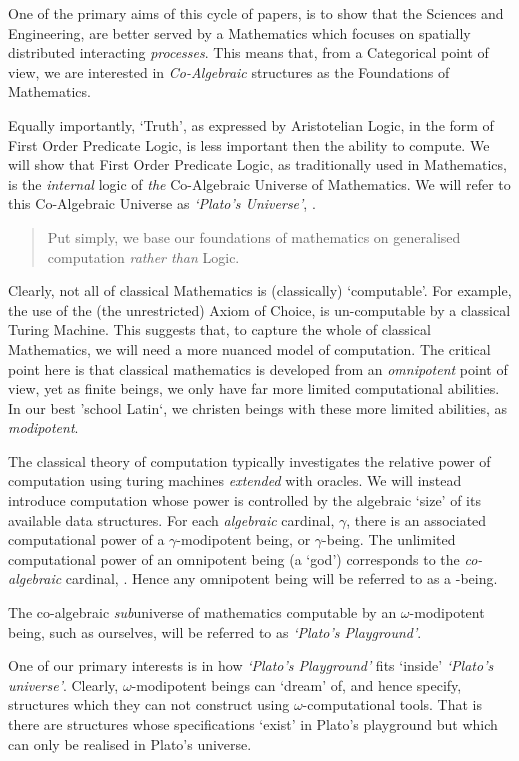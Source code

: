 \documentclass[a4paper,openany]{amsbook}
\newenvironment{myQuote}{\begin{quotation}}{\end{quotation}}
\begin{document}
One of the primary aims of this cycle of papers, is to show that the Sciences
and Engineering, are better served by a Mathematics which focuses on spatially
distributed interacting \emph{processes}. This means that, from a Categorical
point of view, we are interested in \emph{Co-Algebraic} structures as the
Foundations of Mathematics.

Equally importantly, `Truth', as expressed by Aristotelian Logic, in the form of
First Order Predicate Logic, is less important then the ability to compute. We
will show that First Order Predicate Logic, as traditionally used in
Mathematics, is the \emph{internal} logic of \emph{the} Co-Algebraic Universe of
Mathematics. We will refer to this Co-Algebraic Universe as \emph{`Plato's
Universe'}, \Universe{}{}.

\begin{myQuote}
Put simply, we base our foundations of mathematics on generalised
computation \emph{rather than} Logic.
\end{myQuote}

Clearly, not all of classical Mathematics is (classically) `computable'. For
example, the use of the (the unrestricted) Axiom of Choice, is un-computable by
a classical Turing Machine. This suggests that, to capture the whole of
classical Mathematics, we will need a more nuanced model of computation. The
critical point here is that classical mathematics is developed from an
\emph{omnipotent} point of view, yet as finite beings, we only have far more
limited computational abilities. In our best 'school Latin`, we christen beings
with these more limited abilities, as \emph{modipotent}.

The classical theory of computation typically investigates the relative power of
computation using turing machines \emph{extended} with oracles. We will instead
introduce computation whose power is controlled by the algebraic `size' of its
available data structures. For each \emph{algebraic} cardinal, $\gamma$, there
is an associated computational power of a $\gamma$-modipotent being, or
$\gamma$-being. The unlimited computational power of an omnipotent being (a
`god') corresponds to the \emph{co-algebraic} cardinal, \Cardinal. Hence any
omnipotent being will be referred to as a \Cardinal-being.

The co-algebraic \emph{sub}universe of mathematics computable by an
$\omega$-modipotent being, such as ourselves, will be referred to as
\emph{`Plato's Playground'}.

One of our primary interests is in how \emph{`Plato's Playground'} fits `inside'
\emph{`Plato's universe'}. Clearly, $\omega$-modipotent beings can `dream' of,
and hence specify, structures which they can not construct using
$\omega$-computational tools. That is there are structures whose specifications
`exist' in Plato's playground but which can only be realised in Plato's
universe.
\end{document}
